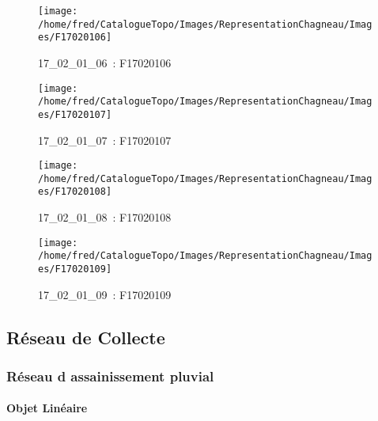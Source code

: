 \documentclass[12pt,titlepage,oneside]{book}
\begin{document}
\begin{figure}[h!]
\begin{minipage}[t]{3cm}
    \begin{center}
      \texttt{[image: /home/fred/CatalogueTopo/Images/RepresentationChagneau/Images/F17020106]}
      \caption[~17\_02\_01\_06]{\small{17\_02\_01\_06~:} \tiny{F17020106}}\label{F17020106}
    \end{center}
  \end{minipage}
  \begin{minipage}[t]{3cm}
    \begin{center}
      \texttt{[image: /home/fred/CatalogueTopo/Images/RepresentationChagneau/Images/F17020107]}
      \caption[~17\_02\_01\_07]{\small{17\_02\_01\_07~:} \tiny{F17020107}}\label{F17020107}
    \end{center}
  \end{minipage}
  \begin{minipage}[t]{3cm}
    \begin{center}
      \texttt{[image: /home/fred/CatalogueTopo/Images/RepresentationChagneau/Images/F17020108]}
      \caption[~17\_02\_01\_08]{\small{17\_02\_01\_08~:} \tiny{F17020108}}\label{F17020108}
    \end{center}
  \end{minipage}
  \begin{minipage}[t]{3cm}
    \begin{center}
      \texttt{[image: /home/fred/CatalogueTopo/Images/RepresentationChagneau/Images/F17020109]}
      \caption[~17\_02\_01\_09]{\small{17\_02\_01\_09~:} \tiny{F17020109}}\label{F17020109}
    \end{center}
  \end{minipage}
\end{figure}
\subsection{Réseau de Collecte}
\subsubsection{\large Réseau d assainissement pluvial}
\paragraph{Objet Linéaire}
\noindent
\vspace{\baselineskip}
\end{document}
